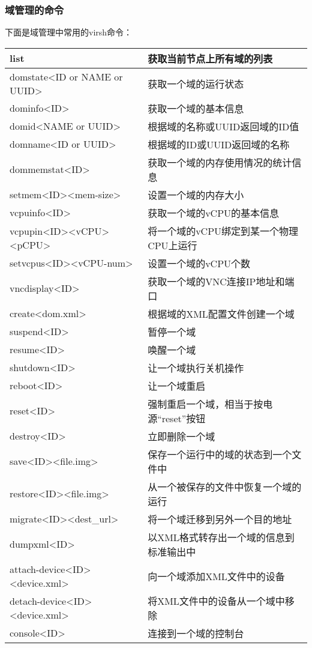 \documentclass[a4paper,left=2.5cm,right=2.5cm,11pt]{article}
\begin{document}
\subsubsection{域管理的命令}
	下面是域管理中常用的virsh命令：
	\begin{longtable}{p{6cm}p{7cm}}
	\hline
	list & 获取当前节点上所有域的列表 \\
	\hline
	domstate<ID or NAME or UUID> & 获取一个域的运行状态 \\
	\hline
	dominfo<ID> & 获取一个域的基本信息 \\
	\hline
	domid<NAME or UUID> & 根据域的名称或UUID返回域的ID值 \\
	\hline
	domname<ID or UUID> & 根据域的ID或UUID返回域的名称 \\
	\hline
	dommemstat<ID> & 获取一个域的内存使用情况的统计信息 \\
	\hline
	setmem<ID><mem-size> & 设置一个域的内存大小 \\
	\hline
	vcpuinfo<ID> & 获取一个域的vCPU的基本信息 \\
	\hline
	vcpupin<ID><vCPU><pCPU> & 将一个域的vCPU绑定到某一个物理CPU上运行 \\
	\hline
	setvcpus<ID><vCPU-num> & 设置一个域的vCPU个数 \\
	\hline
	vncdisplay<ID> & 获取一个域的VNC连接IP地址和端口 \\
	\hline
	create<dom.xml> & 根据域的XML配置文件创建一个域 \\
	\hline
	suspend<ID> & 暂停一个域 \\
	\hline
	resume<ID> & 唤醒一个域 \\
	\hline
	shutdown<ID> & 让一个域执行关机操作 \\
	\hline
	reboot<ID> & 让一个域重启 \\
	\hline
	reset<ID> & 强制重启一个域，相当于按电源“reset”按钮 \\
	\hline
	destroy<ID> & 立即删除一个域 \\
	\hline
	save<ID><file.img> & 保存一个运行中的域的状态到一个文件中 \\
	\hline
	restore<ID><file.img> & 从一个被保存的文件中恢复一个域的运行 \\
	\hline
	migrate<ID><dest\_url> & 将一个域迁移到另外一个目的地址 \\
	\hline
	dumpxml<ID> & 以XML格式转存出一个域的信息到标准输出中 \\
	\hline
	attach-device<ID><device.xml> & 向一个域添加XML文件中的设备 \\
	\hline
	detach-device<ID><device.xml> & 将XML文件中的设备从一个域中移除 \\
	\hline
	console<ID> & 连接到一个域的控制台 \\
	\hline
	\end{longtable}
\end{document}
